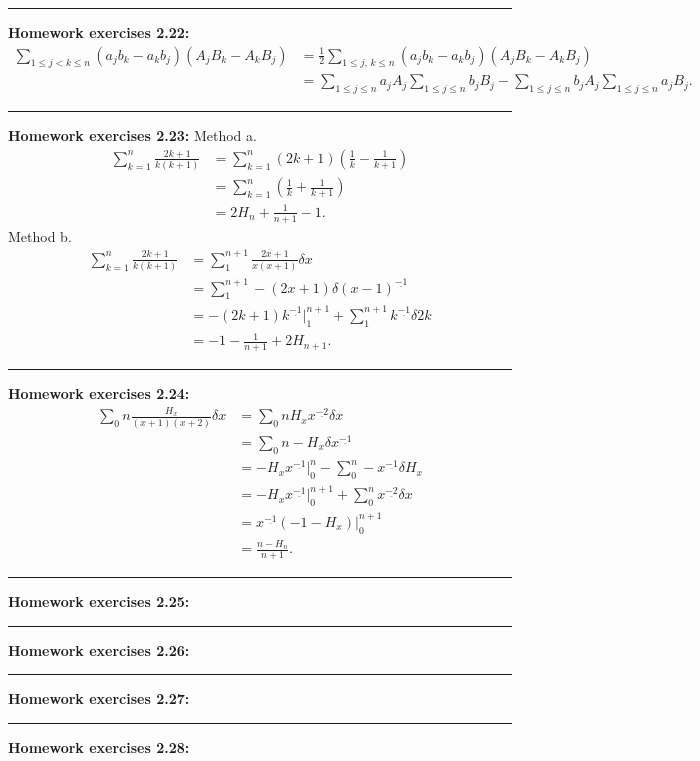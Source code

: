 \documentclass{article}
\begin{document}
\noindent\rule{\textwidth}{0.4pt}
\textbf{Homework exercises 2.22:}
\begin{align}
\sum_{1 \le j < k \le n} (a_j b_k - a_k b_j)(A_j B_k - A_k B_j) &= \frac{1}{2} \sum_{1 \le j\text{, } k \le n} (a_j b_k - a_k b_j)(A_j B_k - A_k B_j) \\
								&= \sum_{1 \le j \le n} a_j A_j \sum_{1 \le j \le n} b_j B_j - \sum_{1 \le j \le n} b_j A_j \sum_{1 \le j \le n} a_j B_j.
\end{align}

\noindent\rule{\textwidth}{0.4pt}
\textbf{Homework exercises 2.23:}
Method a.
\begin{align}
\sum_{k=1}^n \frac{2k+1}{k(k+1)} &= \sum_{k=1}^n (2k+1)(\frac{1}{k} - \frac{1}{k+1}) \\
				 &= \sum_{k=1}^n (\frac{1}{k} + \frac{1}{k+1}) \\
				 &= 2H_n + \frac{1}{n+1} - 1.
\end{align}
Method b.
\begin{align}
\sum_{k=1}^n \frac{2k+1}{k(k+1)} &= \sum\nolimits_{1}^{n+1} \frac{2x+1}{x(x+1)} \delta x \\
				 &= \sum\nolimits_{1}^{n+1} -(2x+1) \delta (x-1)^{\underline {-1}} \\
				 &= -(2k+1)k^{\underline {-1}}\Big|_1^{n+1} + \sum\nolimits_{1}^{n+1} k^{\underline {-1}} \delta 2k\\
				 &= -1 - \frac{1}{n+1} + 2H_{n+1}.
\end{align}

\noindent\rule{\textwidth}{0.4pt}
\textbf{Homework exercises 2.24:}
\begin{align}
\sum\nolimits_{0}{n} \frac{H_x}{(x+1)(x+2)} \delta x &= \sum\nolimits_{0}{n} H_x x^{\underline {-2}} \delta x \\
						       &= \sum\nolimits_{0}{n} -H_x \delta x^{\underline {-1}} \\
						       &= -H_x x^{\underline {-1}}\Big|_0^{n} - \sum\nolimits_{0}^{n} -x^{\underline {-1}} \delta H_x \\
						       &= -H_x x^{\underline {-1}}\Big|_0^{n+1} + \sum\nolimits_{0}^{n} x^{\underline {-2}} \delta x\\
						       &= x^{\underline {-1}} (-1 - H_x) \Big|_0^{n+1}\\
						       &= \frac{n - H_n}{n+1}.
\end{align}
\noindent\rule{\textwidth}{0.4pt}
\textbf{Homework exercises 2.25:}


\noindent\rule{\textwidth}{0.4pt}
\textbf{Homework exercises 2.26:}

\noindent\rule{\textwidth}{0.4pt}
\textbf{Homework exercises 2.27:}

\noindent\rule{\textwidth}{0.4pt}
\textbf{Homework exercises 2.28:}
\end{document}
